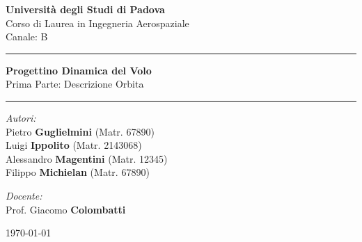 \documentclass[12pt, a4paper]{article}
\newcommand{\hr}{\rule{\linewidth}{0.5mm}}
\begin{document}
\begin{titlepage}
    \centering
    
    {\Large \textbf{Università degli Studi di Padova}} \\
    \vspace{0.3cm}
    {\large Corso di Laurea in Ingegneria Aerospaziale} \\
    \vspace{0.3cm}
    {\normalsize Canale: B} \\
    
    \vspace{2.5cm}
    
    \hr 
    \vspace{0.4cm}
    {\Huge \bfseries Progettino Dinamica del Volo} \\
    \vspace{0.2cm}
    {\large Prima Parte: Descrizione Orbita}
    \vspace{0.4cm}
    \hr
    
    \vspace{3cm}
   
    \vspace{2cm}
    
    \vfill 
    
    \begin{minipage}{0.45\textwidth}
        \begin{flushleft} \large
            \emph{Autori:}\\
            Pietro \textbf{Guglielmini} (Matr. 67890)\\
            Luigi \textbf{Ippolito} (Matr. 2143068)\\
            Alessandro \textbf{Magentini} (Matr. 12345)\\
            Filippo \textbf{Michielan} (Matr. 67890)\\
            
            
        \end{flushleft}
    \end{minipage}
    \begin{minipage}{0.45\textwidth}
        \begin{flushright} \large
            \emph{Docente:} \\
            Prof. Giacomo \textbf{Colombatti}
        \end{flushright}
    \end{minipage}
    
    \vspace{1.5cm}
    {\large \today}
\end{titlepage}
\end{document}
